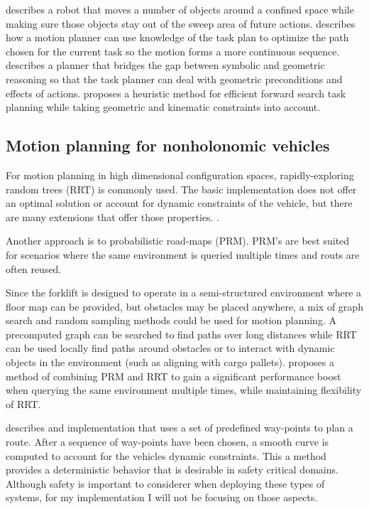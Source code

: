 \documentclass[letterpaper, 10 pt, conference]{ieeeconf}  %
\begin{document}
\cite{hpn2} describes a robot that moves a number of objects around a confined space while making sure those objects stay out of the sweep area of future actions. \cite{waipointSequence} describes how a motion planner can use knowledge of the task plan to optimize the path chosen for the current task so the motion forms a more continuous sequence. \cite{asymov} describes a planner that bridges the gap between symbolic and geometric reasoning so that the task planner can deal with geometric preconditions and effects of actions. \cite{ffrob} proposes a heuristic method for efficient forward search task planning while taking geometric and kinematic constraints into account.



\subsection{Motion planning for nonholonomic vehicles}

For motion planning in high dimensional configuration spaces, rapidly-exploring random trees (RRT) is commonly used. The basic implementation does not offer an optimal solution or account for dynamic constraints of the vehicle, but there are many extensions that offer those properties. \cite{dustin13}\cite{luigi_rrt}\cite{lqr_rrt}.


Another approach is to probabilistic road-maps (PRM). PRM's are best suited for scenarios where the same environment is queried multiple times and routs are often reused.

Since the forklift is designed to operate in a semi-structured environment where a floor map can be provided, but obstacles may be placed anywhere, a mix of graph search and random sampling methods could be used for motion planning. A precomputed graph can be searched to find paths over long distances while RRT can be used locally find paths around obstacles or to interact with dynamic objects in the environment (such as aligning with cargo pallets). \cite{prm_rrt} proposes a method of combining PRM and RRT to gain a significant performance boost when querying the same environment multiple times, while maintaining flexibility of RRT.

\cite{hentschel07} describes and implementation that uses a set of predefined way-points to plan a route. After a sequence of way-points have been chosen, a smooth curve is computed to account for the vehicles dynamic constraints. This a method provides a deterministic behavior that is desirable in safety critical domains. 
Although safety is important to considerer when deploying these types of systems, for my implementation I will not be focusing on those aspects.
\end{document}
